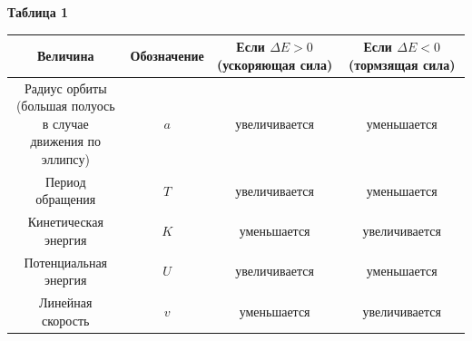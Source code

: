 \leftskip=0cm \rightskip=0cm
\fontsize{14}{10}\selectfont
\begin{minipage}{10cm}
	\begin{flushright}
		\textbf{Таблица 1}
	\end{flushright}
	\begin{center}
		\begin{tabular}{ c |c| c| c }
			\hline
			Величина & Обозначение & \makecell{Если $\Delta E > 0$\\ (ускоряющая сила)} & \makecell{Если $\Delta E <0 $\\ (тормзящая сила)} \\ [0.5ex]
			\hline
			\makecell{Радиус орбиты\\(большая полуось в случае\\ движения по эллипсу)} & $a$ & увеличивается & уменьшается \\
			Период обращения & $T$ & увеличивается & уменьшается \\
			Кинетическая энергия & $K$ & уменьшается & увеличивается \\
			Потенциальная энергия & $U$ & увеличивается & уменьшается \\
			Линейная скорость & $v$ & уменьшается & увеличивается \\
		\end{tabular}
	\end{center}
\end{minipage}




